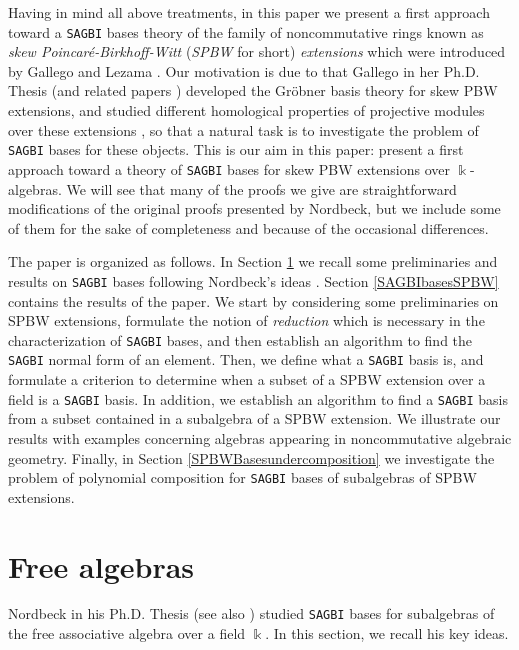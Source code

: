 \documentclass{amsart}
\theoremstyle{definition}
\theoremstyle{remark}
\numberwithin{equation}{section}
\begin{document}
Having in mind all above treatments, in this paper we present a first approach toward a \texttt{SAGBI} bases theory of the family of noncommutative rings known as {\em skew Poincar\'e-Birkhoff-Witt} ({\em SPBW} for short) {\em extensions} which were introduced by Gallego and Lezama \cite{GallegoLezama2010}. Our motivation is due to that Gallego in her Ph.D. Thesis \cite{Gallego2015PhD} (and related papers \cite{Gallego2016FG, GallegoLezama2010}) developed the Gr\"obner basis theory for skew PBW extensions, and studied different homological properties of projective modules over these extensions \cite{Gallego2016, GallegoLezama2017}, so that a natural task is to investigate the problem of \texttt{SAGBI} bases for these objects. This is our aim in this paper: present a first approach toward a theory of \texttt{SAGBI} bases for skew PBW extensions over $\Bbbk$-algebras. We will see that many of the proofs we give are straightforward modifications of the original proofs presented by Nordbeck, but we include some of them for the sake of completeness and because of the occasional differences.

The paper is organized as follows. In Section \ref{Freealgebras} we recall some preliminaries and results on \texttt{SAGBI} bases following Nordbeck's ideas \cite{Nordbeck1998, NordbeckPhD2001}. Section \ref{SAGBIbasesSPBW} contains the results of the paper. We start by considering some preliminaries on SPBW extensions, formulate the notion of {\em reduction} which is necessary in the characterization of \texttt{SAGBI} bases, and then establish an algorithm to find the \texttt{SAGBI} normal form of an element. Then, we define what a \texttt{SAGBI} basis is, and formulate a criterion to determine when a subset of a SPBW extension over a field is a \texttt{SAGBI} basis. In addition, we establish an algorithm to find a \texttt{SAGBI} basis from a subset contained in a subalgebra of a SPBW extension. We illustrate our results with examples concerning algebras appearing in noncommutative algebraic geometry. Finally, in Section \ref{SPBWBasesundercomposition} we investigate the problem of polynomial composition for \texttt{SAGBI} bases of subalgebras of SPBW extensions. 


\section{Free algebras}\label{Freealgebras}

Nordbeck in his Ph.D. Thesis \cite{NordbeckPhD2001} (see also \cite{Nordbeck1998, Nordbeck2002}) studied \texttt{SAGBI} bases for subalgebras of the free associative algebra over a field $\Bbbk$. In this section, we recall his key ideas.
\end{document}
